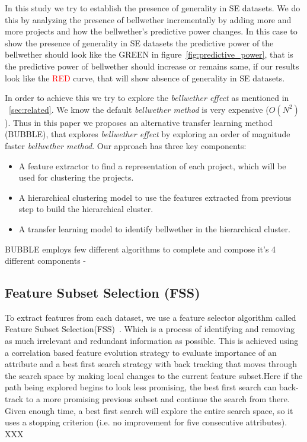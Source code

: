 \documentclass[sigconf,review]{acmart}
\newcommand{\bi}{\begin{itemize}[leftmargin=0.4cm]}
\newcommand{\ei}{\end{itemize}}
\theoremstyle{break}
\begin{document}
In this study we try to establish the presence of generality in SE datasets. We do this by analyzing the presence of bellwether incrementally by adding more and more projects and how the bellwether's predictive power changes. In this case to show the presence of generality in SE datasets the predictive power of the bellwether should look like the \textcolor{ao(english)}{GREEN} in figure~\ref{fig:predictive_power}, that is the predictive power of bellwether should increase or remains same, if our results look like the \textcolor{red}{RED} curve, that will show absence of generality in SE datasets.

In order to achieve this we try to explore the \textit{bellwether effect} as mentioned in ~\ref{sec:related}. We know the default \textit{bellwether method} is very expensive ($ O(N^2) $). Thus in this paper we proposes an alternative transfer learning method (BUBBLE), that explores \textit{bellwether effect} by exploring an order of magnitude faster \textit{bellwether method}. Our approach has three key components:

\bi

    \item A feature extractor to find a representation of each project, which will be used for clustering the projects. 
    
    \item A hierarchical clustering model to use the features extracted from previous step to build the hierarchical cluster.
    
    \item A transfer learning model to identify bellwether in the hierarchical cluster.

\ei

BUBBLE employs few different algorithms to complete and compose it's 4 different components - 

\subsection{Feature Subset Selection (FSS)}
\label{subsec:FSS}
To extract features from each dataset, we use a feature selector algorithm called Feature Subset Selection(FSS)~\cite{hall1999correlation,hall1997feature}. Which is a process of identifying and removing as much irrelevant and redundant information as possible. This is achieved using a correlation based feature evolution strategy to evaluate importance of an attribute and a best first search strategy with back tracking that moves through the search space by making local changes to the current feature subset.Here if the path being explored begins to look less promising, the best first search can back-track to a more promising previous subset and continue the search from there. Given enough time, a best first search will explore the entire search space, so it uses a stopping criterion (i.e. no improvement for five consecutive attributes). XXX
\end{document}
